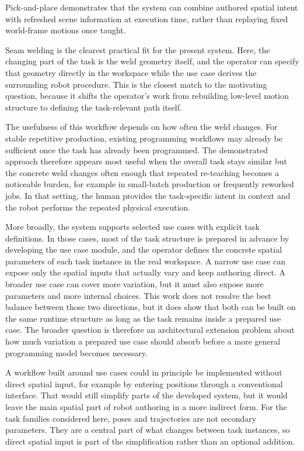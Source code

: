 Pick-and-place demonstrates that the system can combine authored spatial intent with refreshed scene information at execution time, rather than replaying fixed world-frame motions once taught.

Seam welding is the clearest practical fit for the present system. Here, the changing part of the task is the weld geometry itself, and the operator can specify that geometry directly in the workspace while the use case derives the surrounding robot procedure. This is the closest match to the motivating question, because it shifts the operator's work from rebuilding low-level motion structure to defining the task-relevant path itself.

The usefulness of this workflow depends on how often the weld changes. For stable repetitive production, existing programming workflows may already be sufficient once the task has already been programmed. The demonstrated approach therefore appears most useful when the overall task stays similar but the concrete weld changes often enough that repeated re-teaching becomes a noticeable burden, for example in small-batch production or frequently reworked jobs. In that setting, the human provides the task-specific intent in context and the robot performs the repeated physical execution.

More broadly, the system supports selected use cases with explicit task definitions. In those cases, most of the task structure is prepared in advance by developing the use case module, and the operator defines the concrete spatial parameters of each task instance in the real workspace. A narrow use case can expose only the spatial inputs that actually vary and keep authoring direct. A broader use case can cover more variation, but it must also expose more parameters and more internal choices. This work does not resolve the best balance between those two directions, but it does show that both can be built on the same runtime structure as long as the task remains inside a prepared use case. The broader question is therefore an architectural extension problem about how much variation a prepared use case should absorb before a more general programming model becomes necessary.

A workflow built around use cases could in principle be implemented without direct spatial input, for example by entering positions through a conventional interface. That would still simplify parts of the developed system, but it would leave the main spatial part of robot authoring in a more indirect form. For the task families considered here, poses and trajectories are not secondary parameters. They are a central part of what changes between task instances, so direct spatial input is part of the simplification rather than an optional addition.

